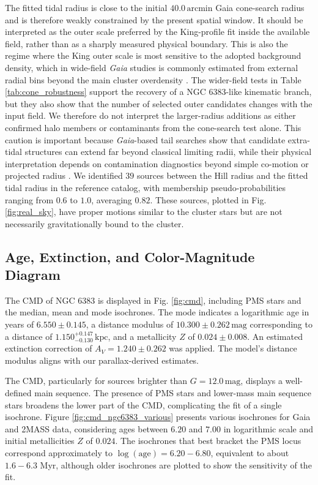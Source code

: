 \documentclass{aa}
\begin{document}
The fitted tidal radius is close to the initial $40.0\,\mathrm{arcmin}$ Gaia cone-search radius and is therefore weakly constrained by the present spatial window. It should be interpreted as the outer scale preferred by the King-profile fit inside the available field, rather than as a sharply measured physical boundary. This is also the regime where the King outer scale is most sensitive to the adopted background density, which in wide-field \textit{Gaia} studies is commonly estimated from external radial bins beyond the main cluster overdensity \citep{2025MNRAS.539.2513A}. The wider-field tests in Table \ref{tab:cone_robustness} support the recovery of a NGC 6383-like kinematic branch, but they also show that the number of selected outer candidates changes with the input field. We therefore do not interpret the larger-radius additions as either confirmed halo members or contaminants from the cone-search test alone. This caution is important because \textit{Gaia}-based tail searches show that candidate extra-tidal structures can extend far beyond classical limiting radii, while their physical interpretation depends on contamination diagnostics beyond simple co-motion or projected radius \citep{2025A&A...694A.258R,2025A&A...698A.156X}. We identified $39$ sources between the Hill radius and the fitted tidal radius in the reference catalog, with membership pseudo-probabilities ranging from $0.6$ to $1.0$, averaging $0.82$. These sources, plotted in Fig. \ref{fig:real_sky}, have proper motions similar to the cluster stars but are not necessarily gravitationally bound to the cluster.

\subsection{Age, Extinction, and Color-Magnitude Diagram}

The CMD of NGC 6383 is displayed in Fig. \ref{fig:cmd}, including PMS stars and the median, mean and mode isochrones. The mode indicates a logarithmic age in years of $6.550 \pm 0.145$, a distance modulus of $10.300\pm 0.262\,\mathrm{mag}$ corresponding to a distance of $1.150_{-0.130}^{+0.147}\,\mathrm{kpc}$, and a metallicity $Z $ of $0.024 \pm 0.008$. An estimated extinction correction of $A_V = 1.240 \pm 0.262$ was applied. The model’s distance modulus aligns with our parallax-derived estimates.

The CMD, particularly for sources brighter than $G=12.0\,\mathrm{mag}$, displays a well-defined main sequence. The presence of PMS stars and lower-mass main sequence stars broadens the lower part of the CMD, complicating the fit of a single isochrone. Figure \ref{fig:cmd_ngc6383_various} presents various isochrones for Gaia and 2MASS data, considering ages between $6.20$ and $7.00$ in logarithmic scale and initial metallicities $ Z $ of $0.024$. The isochrones that best bracket the PMS locus correspond approximately to $\log(\mathrm{age})=6.20-6.80$, equivalent to about $1.6-6.3$ Myr, although older isochrones are plotted to show the sensitivity of the fit.
\end{document}
